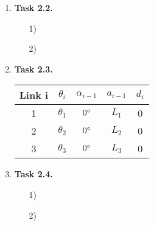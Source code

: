 \documentclass[a4paper,11pt]{article}
\begin{document}
\begin {enumerate}
\begin{enumerate}
        For the second rotation around $x_3$ by $\theta_4$, we append the rotation matrix to the right side of ${^0T_3}$.
        \begin{align*}
        	{^0T_3}'' &= {^0T_3} \cdot Rot_{x_3}(\theta_4)\\
        	&= \begin{bmatrix}
			-1 & 0 & 0 & C_1a_1 - C_{3}a_2 - a_3\\
			0 & -1 & 0 & S_1a_1 + S_{3}a_2\\
			0 & 0 & 1 & 0\\
			0 & 0 & 0 & 1
		\end{bmatrix} \begin{bmatrix}
			1 & 0 & 0 & 0\\
			0 & C_4 & -S_4 & 0\\
			0 & S_4 & C_4 & 0\\
			0 & 0 & 0 & 1
		\end{bmatrix}\\
			&= \begin{bmatrix}
			-1 & 0 & 0 & C_1a_1 - C_{3}a_2 - a_3\\
			0 & -C_4 & S_4 & S_1a_1+S_3a_2\\
			0 & S_4 & C_4 & 0\\
			0 & 0 & 0 & 1
		\end{bmatrix}
        \end{align*}
        
    \end{enumerate}

\item[\textbf{Task 2.2.}]

    \begin{enumerate}
        \item[1)]
        \item[2)]
    \end{enumerate}

\item[\textbf{Task 2.3.}]

	\begin{tabular}{|c|c|c|c|c|}
	\hline 
	Link i & $\theta_i$ & $\alpha_{i-1}$ & $a_{i-1}$ & $d_i$ \\ 
	\hline 
	1 & $\theta_1$ & $0\degree$ & $L_1$ & 0 \\ 
	\hline 
	2 & $\theta_2$ & $0\degree$ & $L_2$ & 0 \\ 
	\hline 
	3 & $\theta_3$ & $0\degree$ & $L_3$ & 0 \\ 
	\hline 
	\end{tabular} 
    
\item[\textbf{Task 2.4.}]

    \begin{enumerate}
        \item[1)]
        \item[2)]
    \end{enumerate}

\end {enumerate}
\end{document}
